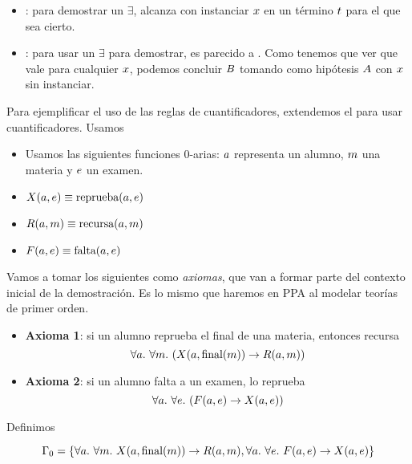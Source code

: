 \proofTreeExistsI
\proofTreeExistsE

\begin{itemize}
    \item {}: para demostrar un $\exists$, alcanza con instanciar $x$ en un término $t$ para el que sea cierto.
    \item {}: para usar un $\exists$ para demostrar, es parecido a . Como tenemos que ver que vale para cualquier $x$, podemos concluir $B$ tomando como hipótesis $A$ con $x$ sin instanciar. 
\end{itemize}

\begin{ejemplo}
    \label{nd:ex:exam-nd-lpo}
    Para ejemplificar el uso de las reglas de cuantificadores, extendemos el  para usar cuantificadores. Usamos

    \begin{itemize}
        \item Usamos las siguientes funciones 0-arias: $a$ representa un
        alumno, $m$ una materia y $e$ un examen.
        \item $X(a, e) \equiv \textrm{reprueba}(a, e)$
        \item $R(a, m) \equiv \textrm{recursa}(a, m)$
        \item $F(a, e) \equiv \textrm{falta}(a, e)$
    \end{itemize}

    Vamos a tomar los siguientes como \textit{axiomas}, que van a formar parte del contexto inicial de la demostración. Es lo mismo que haremos en PPA al modelar teorías de primer orden.

    \begin{itemize}
        \item \textbf{Axioma 1}: si un alumno reprueba el final de una materia, entonces recursa
        \[
            \forall \vAlu .\ \forall \vMat .\
                (\reprueba(\vAlu, \funFinal(\vMat)) \fImp
                \recursa(\vAlu, \vMat))
        \]
        \item \textbf{Axioma 2}: si un alumno falta a un examen, lo reprueba
        \[
            \forall a .\ \forall e .\
                (F(a, e) \to X(a, e))
        \]
    \end{itemize}

    Definimos

    \[
        \Gamma_0 = \{
            \forall a .\ \forall m .\
                X(a, \textrm{final}(m)) \to
                R(a, m),
            \forall a .\ \forall e .\
                F(a, e) \to X(a, e)
        \}
    \]


\end{ejemplo}
